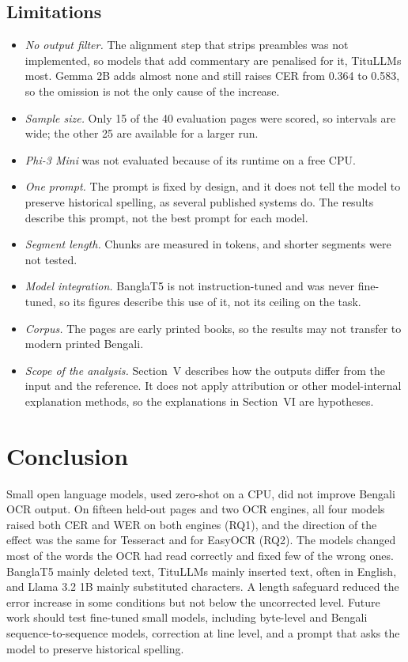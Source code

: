 \documentclass[conference]{IEEEtran}
\begin{document}
\subsection{Limitations}
\begin{itemize}
\item \emph{No output filter.} The alignment step that strips preambles was not implemented, so models that add commentary are penalised for it, TituLLMs most. Gemma 2B adds almost none and still raises CER from 0.364 to 0.583, so the omission is not the only cause of the increase.
\item \emph{Sample size.} Only 15 of the 40 evaluation pages were scored, so intervals are wide; the other 25 are available for a larger run.
\item \emph{Phi-3 Mini} was not evaluated because of its runtime on a free CPU.
\item \emph{One prompt.} The prompt is fixed by design, and it does not tell the model to preserve historical spelling, as several published systems do. The results describe this prompt, not the best prompt for each model.
\item \emph{Segment length.} Chunks are measured in tokens, and shorter segments were not tested.
\item \emph{Model integration.} BanglaT5 is not instruction-tuned and was never fine-tuned, so its figures describe this use of it, not its ceiling on the task.
\item \emph{Corpus.} The pages are early printed books, so the results may not transfer to modern printed Bengali.
\item \emph{Scope of the analysis.} Section~V describes how the outputs differ from the input and the reference. It does not apply attribution or other model-internal explanation methods, so the explanations in Section~VI are hypotheses.
\end{itemize}

\section{Conclusion}

Small open language models, used zero-shot on a CPU, did not improve Bengali OCR output. On fifteen held-out pages and two OCR engines, all four models raised both CER and WER on both engines (RQ1), and the direction of the effect was the same for Tesseract and for EasyOCR (RQ2). The models changed most of the words the OCR had read correctly and fixed few of the wrong ones. BanglaT5 mainly deleted text, TituLLMs mainly inserted text, often in English, and Llama 3.2 1B mainly substituted characters. A length safeguard reduced the error increase in some conditions but not below the uncorrected level. Future work should test fine-tuned small models, including byte-level and Bengali sequence-to-sequence models, correction at line level, and a prompt that asks the model to preserve historical spelling.



\end{document}
